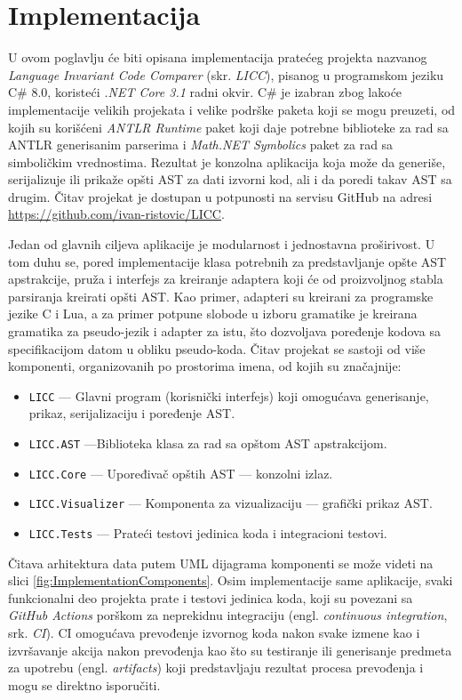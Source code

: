 \chapter{Implementacija}
\label{chp:Implementation}

U ovom poglavlju će biti opisana implementacija pratećeg projekta nazvanog \emph{Language Invariant Code Comparer} (skr. \emph{LICC}), pisanog u programskom jeziku C\# 8.0, koristeći \emph{.NET Core 3.1} radni okvir. C\# je izabran zbog lakoće implementacije velikih projekata i velike podrške paketa koji se mogu preuzeti, od kojih su korišćeni \emph{ANTLR Runtime} paket koji daje potrebne biblioteke za rad sa ANTLR generisanim parserima i \emph{Math.NET Symbolics} paket za rad sa simboličkim vrednostima. Rezultat je konzolna aplikacija koja može da generiše, serijalizuje ili prikaže opšti AST za dati izvorni kod, ali i da poredi takav AST sa drugim. Čitav projekat je dostupan u potpunosti na servisu GitHub na adresi \url{https://github.com/ivan-ristovic/LICC}.

Jedan od glavnih ciljeva aplikacije je modularnost i jednostavna proširivost. U tom duhu se, pored implementacije klasa potrebnih za predstavljanje opšte AST apstrakcije, pruža i interfejs za kreiranje adaptera koji će od proizvoljnog stabla parsiranja kreirati opšti AST. Kao primer, adapteri su kreirani za programske jezike C i Lua, a za primer potpune slobode u izboru gramatike je kreirana gramatika za pseudo-jezik i adapter za istu, što dozvoljava poređenje kodova sa specifikacijom datom u obliku pseudo-koda. Čitav projekat se sastoji od više komponenti, organizovanih po prostorima imena, od kojih su značajnije:
\begin{itemize}
    \item \texttt{LICC} --- Glavni program (korisnički interfejs) koji omogućava generisanje, prikaz, serijalizaciju i poređenje AST.
    \item \texttt{LICC.AST} ---Biblioteka klasa za rad sa opštom AST apstrakcijom.
    \item \texttt{LICC.Core} --- Upoređivač opštih AST --- konzolni izlaz.
    \item \texttt{LICC.Visualizer} --- Komponenta za vizualizaciju --- grafički prikaz AST.
    \item \texttt{LICC.Tests} --- Prateći testovi jedinica koda i integracioni testovi.
\end{itemize}

Čitava arhitektura data putem UML dijagrama komponenti se može videti na slici \ref{fig:ImplementationComponents}. Osim implementacije same aplikacije, svaki funkcionalni deo projekta prate i testovi jedinica koda, koji su povezani sa \emph{GitHub Actions} porškom za neprekidnu integraciju (engl. \emph{continuous integration}, srk. \emph{CI}). CI omogućava prevođenje izvornog koda nakon svake izmene kao i izvršavanje akcija nakon prevođenja kao što su testiranje ili generisanje predmeta za upotrebu (engl. \emph{artifacts}) koji predstavljaju rezultat procesa prevođenja i mogu se direktno isporučiti.

